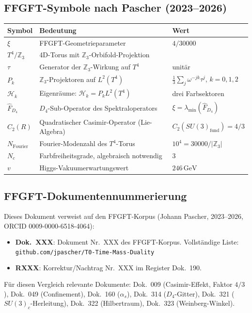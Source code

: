 \subsection*{FFGFT-Symbole nach Pascher (2023--2026)}

\begin{center}
\begin{tabular}{lll}
\toprule
Symbol & Bedeutung & Wert \\
\midrule
$\xi$ & FFGFT-Geometrieparameter & $4/30000$ \\
$T^4/\mathbb{Z}_3$ & 4D-Torus mit $\mathbb{Z}_3$-Orbifold-Projektion & \\
$\tau$ & Generator der $\mathbb{Z}_3$-Wirkung auf $T^4$ & unitär \\
$P_k$ & $\mathbb{Z}_3$-Projektoren auf $L^2(T^4)$ &
  $\frac{1}{3}\sum_j\omega^{-jk}\tau^j$, $k=0,1,2$ \\
$\mathcal{H}_k$ & Eigenräume: $\mathcal{H}_k = P_k L^2(T^4)$ &
  drei Farbsektoren \\
$\hat{F}_{D_4}$ & $D_4$-Sub-Operator des Spektraloperators &
  $\xi = \lambda_{\min}(\hat{F}_{D_4})$ \\
$C_2(R)$ & Quadratischer Casimir-Operator (Lie-Algebra) &
  $C_2(SU(3)_{\text{fund}}) = 4/3$ \\
$N_{\text{Fourier}}$ & Fourier-Modenzahl des $T^4$-Torus &
  $10^4 = 30000/|\mathbb{Z}_3|$ \\
$N_c$ & Farbfreiheitsgrade, algebraisch notwendig & $3$ \\
$v$ & Higgs-Vakuumerwartungswert & $246\,\text{GeV}$ \\
\bottomrule
\end{tabular}
\end{center}

\subsection*{FFGFT-Dokumentennummerierung}

Dieses Dokument verweist auf den FFGFT-Korpus (Johann Pascher,
2023--2026, ORCID 0009-0000-6518-4064):
\begin{itemize}
  \item \textbf{Dok.~XXX}: Dokument Nr.~XXX des FFGFT-Korpus.
    Vollständige Liste: \texttt{github.com/jpascher/T0-Time-Mass-Duality}
  \item \textbf{RXXX}: Korrektur/Nachtrag Nr.~XXX im Register Dok.~190.
\end{itemize}


Für diesen Vergleich relevante Dokumente: Dok.~009 (Casimir-Effekt,
Faktor $4/3$), Dok.~049 (Confinement), Dok.~160 ($\alpha_s$),
Dok.~314 ($D_4$-Gitter), Dok.~321 ($SU(3)_c$-Herleitung),
Dok.~322 (Hilbertraum), Dok.~323 (Weinberg-Winkel).


